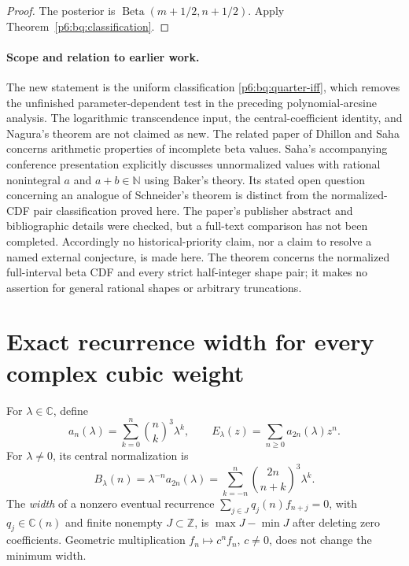 \documentclass[11pt,a4paper]{article}
\theoremstyle{definition}
\theoremstyle{remark}
\numberwithin{equation}{section}
\begin{document}
\begin{proof}
The posterior is $\operatorname{Beta}(m+1/2,n+1/2)$.
Apply Theorem~\ref{p6:bq:classification}.
\end{proof}

\paragraph{Scope and relation to earlier work.}
The new statement is the uniform classification
\eqref{p6:bq:quarter-iff}, which removes the unfinished
parameter-dependent test in the preceding polynomial-arcsine analysis.
The logarithmic transcendence input, the central-coefficient identity,
and Nagura's theorem are not claimed as new. The related paper of
Dhillon and Saha \cite{p6:bq:DhillonSaha} concerns arithmetic properties of
incomplete beta values. Saha's accompanying conference presentation
\cite{p6:bq:SahaSlides} explicitly discusses unnormalized values with
rational nonintegral $a$ and $a+b\in\mathbb N$ using Baker's theory.
Its stated open question concerning an analogue of Schneider's theorem
is distinct from the normalized-CDF pair classification proved here.
The paper's publisher abstract and bibliographic details were checked,
but a full-text comparison has not been completed.
Accordingly no historical-priority claim, nor a claim to resolve a named
external conjecture, is made here. The theorem concerns the normalized
full-interval beta CDF and every strict half-integer shape pair;
it makes no assertion for general rational shapes or arbitrary truncations.


\clearpage

\section{Exact recurrence width for every complex cubic weight}
\label{p6:sec:cubic-width}

For $\lambda\in\mathbb C$, define
\[
 a_n(\lambda)=\sum_{k=0}^n\binom nk^3\lambda^k,
 \qquad E_\lambda(z)=\sum_{n\geq0}a_{2n}(\lambda)z^n.
\]
For $\lambda\ne0$, its central normalization is
\[
 B_\lambda(n)=\lambda^{-n}a_{2n}(\lambda)
 =\sum_{k=-n}^n\binom{2n}{n+k}^3\lambda^k.
\]
The \emph{width} of a nonzero eventual recurrence
$\sum_{j\in J}q_j(n)f_{n+j}=0$, with $q_j\in\mathbb C(n)$ and
finite nonempty $J\subset\mathbb Z$, is $\max J-\min J$ after deleting
zero coefficients. Geometric multiplication $f_n\mapsto c^nf_n$, $c\ne0$,
does not change the minimum width.
\end{document}
